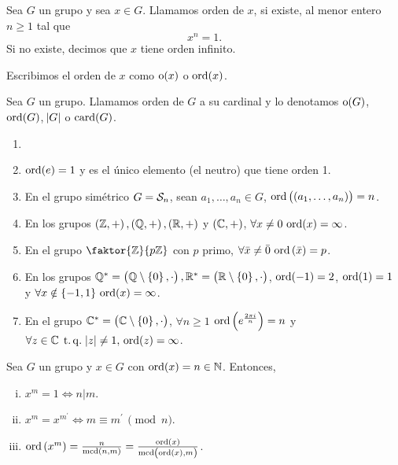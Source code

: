 \begin{defi}
    Sea $G$ un grupo y sea $x \in G$. Llamamos orden de $x$, si existe, al menor entero $n \geq 1$ tal que
    \[
        x^n = 1.
    \]
    Si no existe, decimos que $x$ tiene orden infinito.
\end{defi}

\begin{obs}
    Escribimos el orden de $x$ como $\operatorname{o}(x)$ o $\operatorname{ord}(x)$.
\end{obs}

\begin{defi}
    Sea $G$ un grupo. Llamamos orden de $G$ a su cardinal y lo denotamos $\operatorname{o}(G)$, $\operatorname{ord}(G)$, $\abs{G}$ o $\operatorname{card}(G)$.
\end{defi}

\begin{example}
    \begin{enumerate}[1.]
        \item[]
        \item $\operatorname{ord}(e) = 1$ y es el único elemento (el neutro) que tiene orden 1.
        \item En el grupo simétrico $G = \mathcal{S}_n$, sean $a_1, \dots, a_n \in G$, $\operatorname{ord}\left(\left( a_1, \dots, a_n \right)\right) = n$.
        \item En los grupos $\left( \mathbb{Z}, +\right) , \left( \mathbb{Q}, +\right), \left( \mathbb{R}, +\right)$ y $\left( \mathbb{C}, +\right)$, $\forall x \neq 0 \, \operatorname{ord}(x) = \infty$.
        \item En el grupo $\faktor{\z}{p\z}$ con $p$ primo, $\forall \bar{x} \neq \bar{0} \, \operatorname{ord}\left( \bar{x} \right) = p$.
        \item En los grupos $\mathbb{Q}^{\ast}=\left( \mathbb{Q}\setminus \left\{ 0\right\}, \cdot \right), \mathbb{R}^{\ast}=\left( \mathbb{R}\setminus \left\{ 0\right\}, \cdot\right)$, $\operatorname{ord}(-1) = 2$, $\operatorname{ord}(1) = 1$ y $\forall x \notin \left\{-1, 1\right\} \, \operatorname{ord}(x) = \infty$.
        \item En el grupo $\mathbb{C}^{\ast}=\left( \mathbb{C}\setminus \left\{ 0\right\}, \cdot \right)$, $\forall n \geq 1$ $\operatorname{ord}\left( e^{\frac{2 \pi i}{n}} \right) = n$ y $\forall z \in \mathbb{C} \operatorname{\;t.q.\;} \abs{z} \neq 1, \, \operatorname{ord}(z) = \infty$.
    \end{enumerate}
\end{example}

\begin{lema}
    Sea $G$ un grupo y $x \in G$ con $\operatorname{ord}(x) = n\in\mathbb{N}$. Entonces,
    \begin{enumerate}[i)]
        \item $x^m = 1 \iff n \vert m$.
        \item $x^m = x^{m^\prime} \iff m \equiv m^\prime \, \pmod{n}$.
        \item $\operatorname{ord}\left( x^m \right) = \frac{n}{\operatorname{mcd}(n, m)} = \frac{\operatorname{ord}(x)}{\operatorname{mcd}\left( \operatorname{ord}(x), m \right)}$.
    \end{enumerate}
\end{lema}

